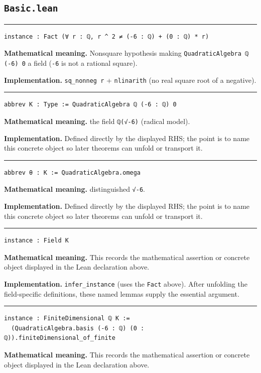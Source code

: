 \documentclass[UTF8,a4paper,11pt,fontset=fandol]{ctexart}
\theoremstyle{definition}
\newcommand{\statementsep}{\par\medskip\hrule\medskip}
\begin{document}
\subsection{\texttt{Basic.lean}}

\statementsep
\begin{verbatim}
instance : Fact (∀ r : ℚ, r ^ 2 ≠ (-6 : ℚ) + (0 : ℚ) * r)
\end{verbatim}
\noindent\textbf{Mathematical meaning.} Nonsquare hypothesis making \texttt{QuadraticAlgebra ℚ (-6) 0} a field (\texttt{-6} is not a rational square).\par
\noindent\textbf{Implementation.} \texttt{sq\_\allowbreak{}nonneg r} + \texttt{nlinarith} (no real square root of a negative).\par
\statementsep
\begin{verbatim}
abbrev K : Type := QuadraticAlgebra ℚ (-6 : ℚ) 0
\end{verbatim}
\noindent\textbf{Mathematical meaning.} the field \texttt{ℚ(√-6)} (radical model).\par
\noindent\textbf{Implementation.} Defined directly by the displayed RHS; the point is to name this concrete object so later theorems can unfold or transport it.\par
\statementsep
\begin{verbatim}
abbrev θ : K := QuadraticAlgebra.omega
\end{verbatim}
\noindent\textbf{Mathematical meaning.} distinguished \texttt{√-6}.\par
\noindent\textbf{Implementation.} Defined directly by the displayed RHS; the point is to name this concrete object so later theorems can unfold or transport it.\par
\statementsep
\begin{verbatim}
instance : Field K
\end{verbatim}
\noindent\textbf{Mathematical meaning.} This records the mathematical assertion or concrete object displayed in the Lean declaration above.\par
\noindent\textbf{Implementation.} \texttt{infer\_\allowbreak{}instance} (uses the \texttt{Fact} above). After unfolding the field-specific definitions, these named lemmas supply the essential argument.\par
\statementsep
\begin{verbatim}
instance : FiniteDimensional ℚ K :=
  (QuadraticAlgebra.basis (-6 : ℚ) (0 : ℚ)).finiteDimensional_of_finite
\end{verbatim}
\noindent\textbf{Mathematical meaning.} This records the mathematical assertion or concrete object displayed in the Lean declaration above.\par
\end{document}
